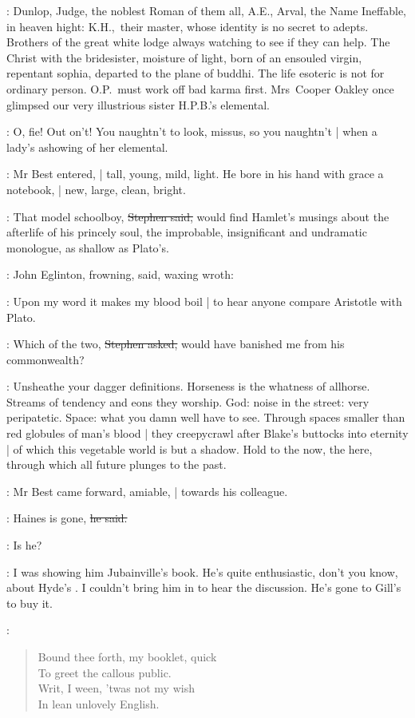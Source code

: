 \StephenInt:
Dunlop,
Judge,
the noblest Roman of them all,
A.E.,
Arval,
the Name Ineffable,
in heaven hight:
K.H.,~their master,
whose identity is no secret to adepts.
Brothers of the great white lodge
always watching to see if they can help.
The Christ with the bridesister,
moisture of light,
born of an ensouled virgin,
repentant sophia,
departed to the plane of buddhi.
The life esoteric is not for ordinary person.
O.P.~must work off bad karma first.
Mrs~Cooper Oakley once glimpsed
our very illustrious sister H.P.B.'s elemental.

\StephenInt:
O, fie!
Out on't!
You naughtn't to look, missus,
so you naughtn't |
when a lady's ashowing of her elemental.

:
Mr Best entered, |
tall, young, mild, light.
He bore in his hand with grace a notebook, |
new, large, clean, bright.

\Stephen:
That model schoolboy,
\sout{Stephen said,}
would find Hamlet's musings about the afterlife of his princely soul,
the improbable,
insignificant and undramatic monologue,
as shallow as Plato's.

:
John Eglinton,
frowning, said, waxing wroth:

\eglinton:
Upon my word
it makes my blood boil |
to hear anyone compare Aristotle with Plato.

\Stephen:
Which of the two,
\sout{Stephen asked,}
would have banished me from his commonwealth?

\StephenInt:
Unsheathe your dagger definitions.
Horseness is the whatness of allhorse.
Streams of tendency and eons they worship.
God: noise in the street:
very peripatetic.
Space: what you damn well have to see.
Through spaces smaller than red globules of man's blood |
they creepycrawl after Blake's buttocks into eternity |
of which this vegetable world is but a shadow.
Hold to the now,
the here,
through which all future plunges to the past.

:
Mr Best came forward, amiable, |
towards his colleague.

\best:
Haines is gone,
\sout{he said.}

\eglinton:
Is he?

\best:
I was showing him Jubainville's book.
He's quite enthusiastic,
don't you know,
about Hyde's .
I couldn't bring him in to hear the discussion.
He's gone to Gill's to buy it.

\StephenInt:
\begin{verse}
    Bound thee forth, my booklet, quick \\
    To greet the callous public. \\
    Writ, I ween, 'twas not my wish \\
    In lean unlovely English.
\end{verse}

